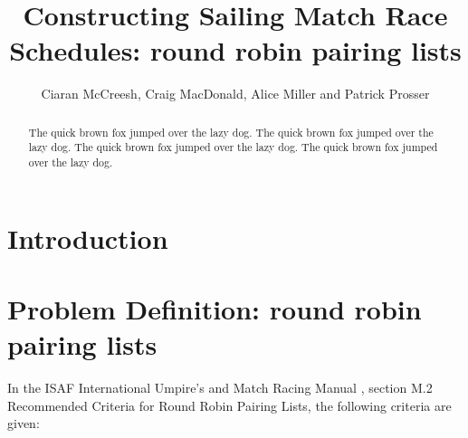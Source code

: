 \documentclass{llncs}
\begin{document}
\title{Constructing Sailing Match Race Schedules: round robin pairing lists}
\author{Ciaran McCreesh, Craig MacDonald, Alice Miller and Patrick Prosser}
\maketitle

\begin{abstract} 
The quick brown fox jumped over the lazy dog. The quick brown fox jumped over the lazy dog. The quick brown fox jumped over the lazy dog. The quick brown fox jumped over the lazy dog.
\end{abstract}

\section{Introduction}

\section{Problem Definition: round robin pairing lists}
In the ISAF International Umpire's and Match Racing Manual \cite{isaf}, section M.2 Recommended Criteria for Round Robin Pairing Lists,  the following criteria are given:
\end{document}
